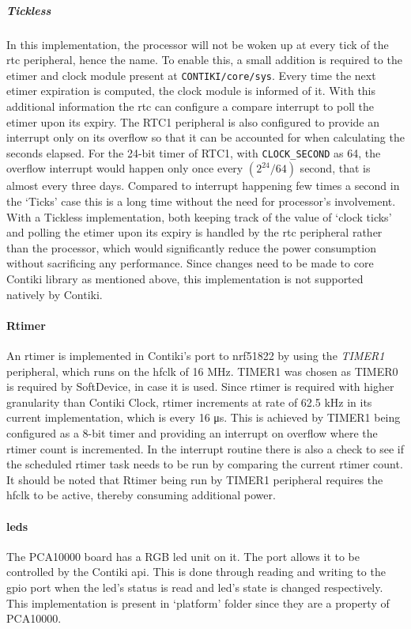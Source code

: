 \subparagraph{Tickless}
In this implementation, the processor will not be woken up at every tick of the \gls{rtc} peripheral, hence the name. To enable this, a small addition is required to the etimer and clock module present at \texttt{CONTIKI/core/sys}. Every time the next etimer expiration is computed, the clock module is informed of it. With this additional information the \gls{rtc} can configure a compare interrupt to poll the etimer upon its expiry. The RTC1 peripheral is also configured to provide an interrupt only on its overflow so that it can be accounted for when calculating the seconds elapsed. For the 24-bit timer of RTC1, with \texttt{CLOCK\_SECOND} as 64, the overflow interrupt would happen only once every $(2^{24}/64)$ second, that is almost every three days. Compared to interrupt happening few times a second in the `Ticks' case this is a long time without the need for processor's involvement. With a Tickless implementation, both keeping track of the value of `clock ticks' and polling the etimer upon its expiry is handled by the \gls{rtc} peripheral rather than the processor, which would significantly reduce the power consumption without sacrificing any performance. Since changes need to be made to core Contiki library as mentioned above, this implementation is not supported natively by Contiki.

\paragraph{Rtimer}
An rtimer is implemented in Contiki's port to nrf51822 by using the \emph{TIMER1} peripheral, which runs on the \gls{hfclk} of 16 MHz. TIMER1 was chosen as TIMER0 is required by SoftDevice, in case it is used. Since rtimer is required with higher granularity than Contiki Clock, rtimer increments at rate of 62.5 kHz in its current implementation, which is every 16 \si{\micro \second}. This is achieved by TIMER1 being configured as a 8-bit timer and providing an interrupt on overflow where the rtimer count is incremented. In the interrupt routine there is also a check to see if the scheduled rtimer task needs to be run by comparing the current rtimer count. It should be noted that Rtimer being run by TIMER1 peripheral requires the \gls{hfclk} to be active, thereby consuming additional power.

\paragraph{\glspl{led}} 
The PCA10000 board has a RGB \gls{led} unit on it. The port allows it to be controlled by the Contiki \gls{api}. This is done through reading and writing to the \gls{gpio} port when the \gls{led}'s status is read and \gls{led}'s state is changed respectively. This implementation is present in `platform' folder since they are a property of PCA10000.

